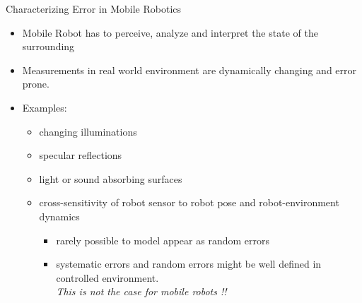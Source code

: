 \documentclass[compress]{beamer}
\begin{document}
\begin{frame}{Characterizing Error in Mobile Robotics}
    \begin{itemize}
        \item Mobile Robot has to perceive, analyze and interpret the state of the
            surrounding

        \item Measurements in real world environment are dynamically changing and
            error prone.

        \item Examples:

            \begin{itemize}
                \item  changing illuminations

                \item specular reflections

                \item light or sound absorbing surfaces

                \item cross-sensitivity of robot sensor to robot pose and robot-environment
                    dynamics

                    \begin{itemize}

                        \item
                            rarely possible to model \rightarrow appear as random errors
                        \item
                            systematic errors and random errors might be well defined in
                            controlled environment.\\\emph{This is not the case for mobile robots
                            !!}
                    \end{itemize}

            \end{itemize}
    \end{itemize}
\end{frame}
\end{document}

